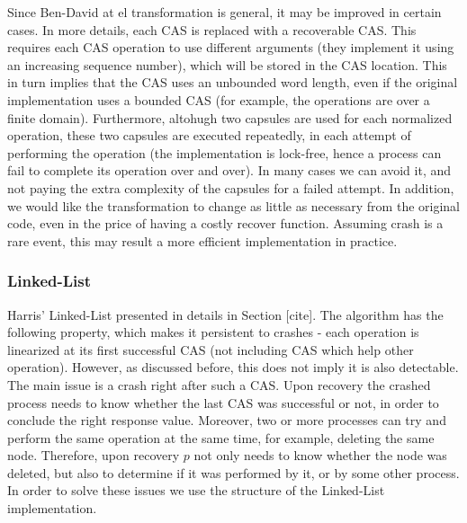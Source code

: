 Since Ben-David at el transformation is general, it may be improved in certain cases. In more details, each CAS is replaced with a recoverable CAS. This requires each CAS operation to use different arguments (they implement it using an increasing sequence number), which will be stored in the CAS location. This in turn implies that the CAS uses an unbounded word length, even if the original implementation uses a bounded CAS (for example, the operations are over a finite domain). Furthermore, altohugh two capsules are used for each normalized operation, these two capsules are executed repeatedly, in each attempt of performing the operation (the implementation is lock-free, hence a process can fail to complete its operation over and over). In many cases we can avoid it, and not paying the extra complexity of the capsules for a failed attempt.
In addition, we would like the transformation to change as little as necessary from the original code, even in the price of having a costly recover function. Assuming crash is a rare event, this may result a more efficient implementation in practice.


\subsubsection*{Linked-List}
Harris' Linked-List presented in details in Section [cite]. The algorithm has the following property, which makes it persistent to crashes - each operation is linearized at its first successful CAS (not including CAS which help other operation). However, as discussed before, this does not imply it is also detectable. The main issue is a crash right after such a CAS. Upon recovery the crashed process needs to know whether the last CAS was successful or not, in order to conclude the right response value. Moreover, two or more processes can try and perform the same operation at the same time, for example, deleting the same node. Therefore, upon recovery $p$ not only needs to know whether the node was deleted, but also to determine if it was performed by it, or by some other process. In order to solve these issues we use the structure of the Linked-List implementation.

